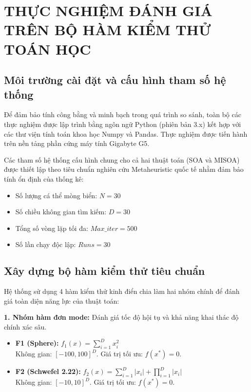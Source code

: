 \documentclass[12pt, a4paper]{article}
\begin{document}
\newpage
\section{THỰC NGHIỆM ĐÁNH GIÁ TRÊN BỘ HÀM KIỂM THỬ TOÁN HỌC}

\subsection{Môi trường cài đặt và cấu hình tham số hệ thống}
Để đảm bảo tính công bằng và minh bạch trong quá trình so sánh, toàn bộ các thực nghiệm được lập trình bằng ngôn ngữ Python (phiên bản 3.x) kết hợp với các thư viện tính toán khoa học Numpy và Pandas. Thực nghiệm được tiến hành trên nền tảng phần cứng máy tính Gigabyte G5.

Các tham số hệ thống cấu hình chung cho cả hai thuật toán (SOA và MISOA) được thiết lập theo tiêu chuẩn nghiên cứu Metaheuristic quốc tế nhằm đảm bảo tính ổn định của thống kê:
\begin{itemize}
    \item Số lượng cá thể mòng biển: $N = 30$
    \item Số chiều không gian tìm kiếm: $D = 30$
    \item Tổng số vòng lặp tối đa: $Max\_iter = 500$
    \item Số lần chạy độc lập: $Runs = 30$
\end{itemize}

\subsection{Xây dựng bộ hàm kiểm thử tiêu chuẩn}
Hệ thống sử dụng 4 hàm kiểm thử kinh điển chia làm hai nhóm chính để đánh giá toàn diện năng lực của thuật toán:

\textbf{1. Nhóm hàm đơn mode:} Đánh giá tốc độ hội tụ và khả năng khai thác độ chính xác sâu.
\begin{itemize}
    \item \textbf{F1 (Sphere):} $f_1(x) = \sum_{i=1}^{D} x_i^2$ \\
    Không gian: $[-100, 100]^D$. Giá trị tối ưu: $f(x^*) = 0$.
    \item \textbf{F2 (Schwefel 2.22):} $f_2(x) = \sum_{i=1}^{D} |x_i| + \prod_{i=1}^{D} |x_i|$ \\
    Không gian: $[-10, 10]^D$. Giá trị tối ưu: $f(x^*) = 0$.
\end{itemize}
\end{document}
